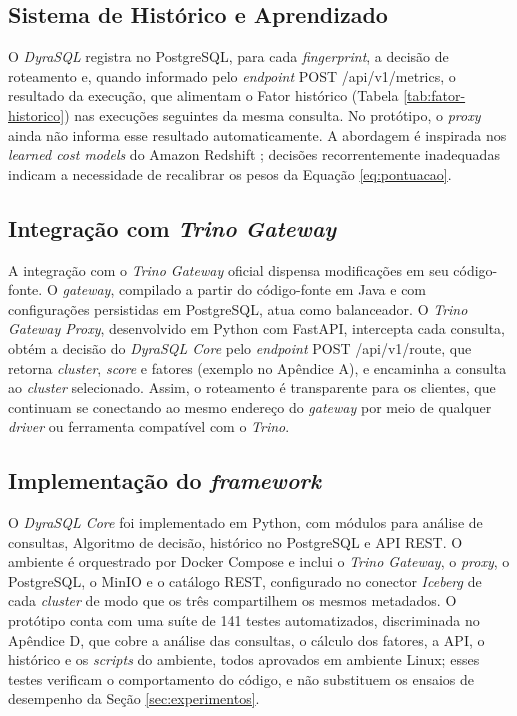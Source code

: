 \subsection{Sistema de Histórico e Aprendizado}

O \textit{DyraSQL} registra no PostgreSQL, para cada \textit{fingerprint}, a decisão de roteamento e, quando informado pelo \textit{endpoint} POST /api/v1/metrics, o resultado da execução, que alimentam o Fator histórico (Tabela \ref{tab:fator-historico}) nas execuções seguintes da mesma consulta. No protótipo, o \textit{proxy} ainda não informa esse resultado automaticamente. A abordagem é inspirada nos \textit{learned cost models} do Amazon Redshift \cite{ding2024}; decisões recorrentemente inadequadas indicam a necessidade de recalibrar os pesos da Equação \ref{eq:pontuacao}.

\subsection{Integração com \textit{Trino Gateway}}

A integração com o \textit{Trino Gateway} oficial dispensa modificações em seu código-fonte. O \textit{gateway}, compilado a partir do código-fonte em Java e com configurações persistidas em PostgreSQL, atua como balanceador. O \textit{Trino Gateway Proxy}, desenvolvido em Python com FastAPI, intercepta cada consulta, obtém a decisão do \textit{DyraSQL Core} pelo \textit{endpoint} POST /api/v1/route, que retorna \textit{cluster}, \textit{score} e fatores (exemplo no Apêndice A), e encaminha a consulta ao \textit{cluster} selecionado. Assim, o roteamento é transparente para os clientes, que continuam se conectando ao mesmo endereço do \textit{gateway} por meio de qualquer \textit{driver} ou ferramenta compatível com o \textit{Trino}.

\subsection{Implementação do \textit{framework}}

O \textit{DyraSQL Core} foi implementado em Python, com módulos para análise de consultas, Algoritmo de decisão, histórico no PostgreSQL e API REST. O ambiente é orquestrado por Docker Compose e inclui o \textit{Trino Gateway}, o \textit{proxy}, o PostgreSQL, o MinIO e o catálogo REST, configurado no conector \textit{Iceberg} de cada \textit{cluster} de modo que os três compartilhem os mesmos metadados. O protótipo conta com uma suíte de 141 testes automatizados, discriminada no Apêndice D, que cobre a análise das consultas, o cálculo dos fatores, a API, o histórico e os \textit{scripts} do ambiente, todos aprovados em ambiente Linux; esses testes verificam o comportamento do código, e não substituem os ensaios de desempenho da Seção \ref{sec:experimentos}.
